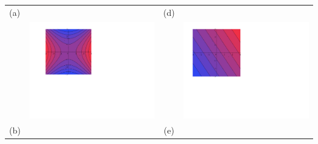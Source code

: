 \documentclass[12pt]{article}
\begin{document}
\begin{enumerate}
\begin{center}
\begin{tabular}{lc|cc}
(a)&&(d)\\
&\includegraphics[scale=0.52]{matching1.pdf} &\hspace{0.5 cm}& \includegraphics[scale=0.5]{matching4.pdf}\\
(b)&&(e)\\

\end{tabular}
\end{center}
\end{enumerate}
\end{document}

